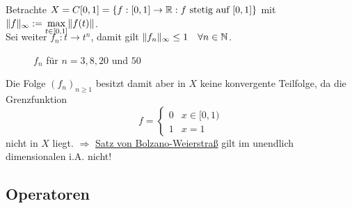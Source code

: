 \begin{beispiel}
	Betrachte $X = C[0, 1] = \{ f : [0, 1] \rightarrow \mathbb{R}: f \text{ stetig auf } [0, 1] \} $ mit $\| f \|_{\infty} :=  \smash{\displaystyle\max_{t \in [0, 1]}}  \| f(t) \|$. \\ 
	Sei weiter $f_{n} : t \rightarrow t^{n}$, damit gilt $\| f_{n} \|_{\infty} \leq 1 \quad \forall n \in \mathbb{N}$.	
	\begin{figure}[H]	
		\begin{center}					
			\caption{$f_{n}$ für $n = 3, 8, 20$ und $50$}
		\end{center}
	\end{figure}					
	Die Folge $(f_{n})_{n \geq 1}$ besitzt damit aber in $X$ keine konvergente Teilfolge, da die Grenzfunktion
		\[ f = \begin{cases} 0 & x \in [0, 1) \\ 1 & x = 1 \end{cases} \]
	nicht in $X$ liegt.
	$ \Rightarrow $ \hyperref[satz:1.1-BolzanoWeierstrass]{Satz von Bolzano-Weierstra{\ss}} gilt im unendlich dimensionalen i.A. nicht!
\end{beispiel}


\subsection{Operatoren}


